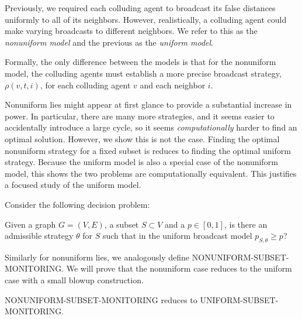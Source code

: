 \documentclass{comnet}
\begin{document}
Previously, we required each colluding agent to broadcast its false distances
uniformly to all of its neighbors. However, realistically, a colluding agent
could make varying broadcasts to different neighbors. We refer to this as the
{\it nonuniform model} and the previous as the {\it uniform model}.

Formally, the only difference between the models is that for the nonuniform
model, the colluding agents must establish a more precise broadcast strategy,
$\rho(v,t,i)$, for each colluding agent $v$ and each neighbor $i$. 

Nonuniform lies might appear at first glance to provide a substantial increase
in power. In particular, there are many more strategies, and it seems easier to
accidentally introduce a large cycle, so it seems \emph{computationally} harder
to find an optimal solution. However, we show this is not the case. Finding the
optimal nonuniform strategy for a fixed subset is reduces to finding the
optimal uniform strategy. Because the uniform model is also a special case of
the nonuniform model, this shows the two problems are computationally
equivalent. This justifies a focused study of the uniform model.

Consider the following decision problem:

\begin{problem}

Given a graph $G = (V,E)$, a subset $S \subset V$ and a $p \in [0,1]$, is there
an admissible strategy $\theta$ for $S$ such that in the uniform broadcast
model $p_{S, \theta} \geq p$?

\end{problem} 

 Similarly for nonuniform lies, we analogously define
NONUNIFORM-SUBSET-MONITORING. We will prove that the nonuniform case reduces to
the uniform case with a small blowup construction.

\begin{proposition} \label{prop:uniform-reduction}

NONUNIFORM-SUBSET-MONITORING reduces to {{UNIFORM-SUBSET-MONITORING}}.

\end{proposition}
\end{document}

